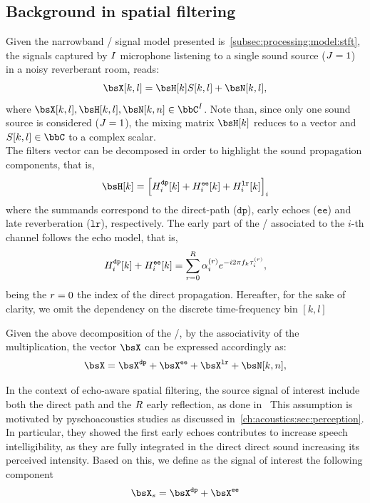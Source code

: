 \subsection{Background in spatial filtering}
Given the narrowband \STFT/ signal model presented is~\cref{subsec:processing:model:stft}, the signals captured by $I$ microphone listening to a single sound source ($J=1$) in a noisy reverberant room, reads:
\begin{equation}
    \MICS[k,l] = \FLTS[k] \SRC[k, l]+ \NSES[k,l]
    ,
\end{equation}
where $\MICS[k,l], \FLTS[k,l], \NSES[k,n] \in \bbC^{\numMics}$.
Note than, since only one sound source is considered ($J=1$), the mixing matrix $\FLTS[k]$ reduces to a vector and $\SRC[k,l] \in \bbC$ to a complex scalar.
\\The filters vector can be decomposed in order to highlight the sound propagation components, that is,
\begin{equation}
    \FLTS[k] = \kbracket{\FLT^{\mathtt{dp}}_{\idxMic}[k]+ \FLT^{\mathtt{ee}}_{\idxMic}[k] + \FLT^{\mathtt{lr}}_{\idxMic}[k] }_\idxMic
\end{equation}
where the summands correspond to the direct-path ($\mathtt{dp}$), early echoes ($\mathtt{ee}$) and late reverberation ($\mathtt{lr}$), respectively.
The early part of the \RIR/ associated to the $i$-th channel follows the echo model, that is,
\begin{equation}\label{eq:dechorateapp:echomodel}
    H^{\mathtt{dp}}_{i}[k]+ H^{\mathtt{ee}}_{i}[k] = \sum_{r=0}^{R} \alpha_{i}^{(r)} {e}^{-{i} 2 \pi f_k \tau_i^{(r)}}
    ,
\end{equation}
being the $r=0$ the index of the direct propagation.
Hereafter, for the sake of clarity, we omit the dependency on the discrete time-frequency bin $[k,l]$

\mynewline
Given the above decomposition of the \RIRs/, by the associativity of the multiplication, the vector $\MICS$ can be expressed accordingly as:
\begin{equation}\label{eq:dechorateapp:mics}
    \MICS = \MICS^{\mathtt{dp}} + \MICS^{\mathtt{ee}} + \MICS^{\mathtt{lr}} + \NSES[k,n]
    ,
\end{equation}

\mynewline
In the context of echo-aware spatial filtering, the source signal of interest include both the direct path and the $R$ early reflection, as done in~
This assumption is motivated by pyschoacoustics studies as discussed in~\cref{ch:acoustics:sec:perception}.
In particular, they showed the first early echoes contributes to increase speech intelligibility, as they are fully integrated in the direct direct sound increasing its perceived intensity.
Based on this, we define as the signal of interest the following component
\begin{equation}
    \MICS_s = \MICS^{\mathtt{dp}} + \MICS^{\mathtt{ee}}
\end{equation}

